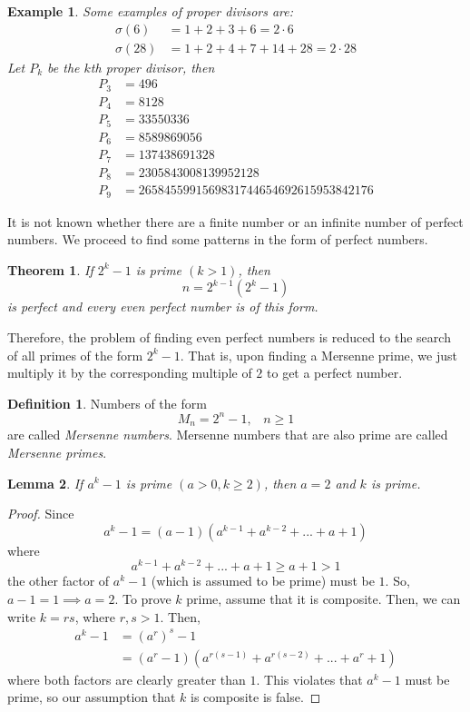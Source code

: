 \documentclass{article}
\newtheorem{theorem}{Theorem}[section]
\newtheorem{lemma}[theorem]{Lemma}
\newtheorem{example}{Example}[section]
\theoremstyle{remark}
\theoremstyle{definition}
\newtheorem{definition}{Definition}[section]
\begin{document}
\begin{example}
Some examples of proper divisors are: 
\begin{align*}
    \sigma(6) & = 1 + 2 + 3 + 6 = 2 \cdot 6 \\
    \sigma(28) & = 1 + 2 + 4+ 7+ 14+ 28 = 2 \cdot 28
\end{align*}
Let $P_k$ be the $k$th proper divisor, then 
\begin{align*}
    P_3 & = 496 \\
    P_4 & = 8128 \\
    P_5 & = 33550336 \\
    P_6 & = 8589869056 \\
    P_7 & = 137438691328 \\
    P_8 & = 2305843008139952128 \\
    P_9 & = 2658455991569831744654692615953842176
\end{align*}
\end{example}

It is not known whether there are a finite number or an infinite number of perfect numbers. We proceed to find some patterns in the form of perfect numbers. 

\begin{theorem}
If $2^k - 1$ is prime $(k > 1)$, then 
\[n = 2^{k-1} (2^k - 1)\]
is perfect and every even perfect number is of this form. 
\end{theorem}

Therefore, the problem of finding even perfect numbers is reduced to the search of all primes of the form $2^k - 1$. That is, upon finding a Mersenne prime, we just multiply it by the corresponding multiple of $2$ to get a perfect number. 

\begin{definition}
Numbers of the form 
\[M_n = 2^n - 1, \;\;\; n \geq 1\]
are called \textit{Mersenne numbers}. Mersenne numbers that are also prime are called \textit{Mersenne primes}. 
\end{definition}

\begin{lemma}
If $a^k - 1$ is prime $(a>0, k \geq 2)$, then $a = 2$ and $k$ is prime. 
\end{lemma}
\begin{proof}
Since
\[a^k - 1 = (a-1)(a^{k-1} + a^{k-2} + ... + a + 1)\]
where
\[a^{k-1} + a^{k-2} + ... + a + 1 \geq a + 1 > 1\]
the other factor of $a^k -1$ (which is assumed to be prime) must be $1$. So, $a-1 = 1 \implies a = 2$. To prove $k$ prime, assume that it is composite. Then, we can write $k = rs$, where $r, s > 1$. Then, 
\begin{align*}
    a^k - 1 & = (a^r)^s - 1 \\
    & = (a^r - 1) (a^{r(s-1)} + a^{r(s-2)} + ... + a^r + 1)
\end{align*}
where both factors are clearly greater than $1$. This violates that $a^k -1$ must be prime, so our assumption that $k$ is composite is false. 
\end{proof}
\end{document}
